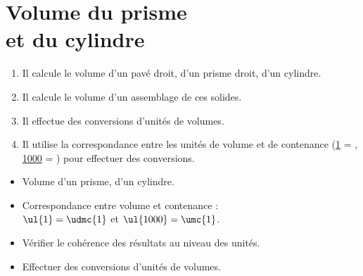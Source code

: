 \themaM
\graphicspath{{../../S19_Volume_du_prisme_et_du_cylindre/Images/}}

\chapter{Volume du prisme\\et du cylindre}
\label{S19}


\begin{autoeval}
   \small
   \begin{enumerate}
      \item Il calcule le volume d'un pavé droit, d'un prisme droit, d'un cylindre.
      \item Il calcule le volume d'un assemblage de ces solides.
      \item Il effectue des conversions d’unités de volumes.
      \item Il utilise la correspondance entre les unités de volume et de contenance (\ul{1} =  , \ul{1000} = ) pour effectuer des conversions.
   \end{enumerate}
\end{autoeval}

\begin{prerequis}
   \begin{itemize}
      \item Volume d'un prisme, d'un cylindre.
      \item Correspondance entre volume et contenance : \\
         $\ul{1} =\udmc{1}$ et $\ul{1000} =\umc{1}$.
      \item[\com] Vérifier le cohérence des résultats au niveau des unités.
      \item[\com] Effectuer des conversions d'unités de volumes.
   \end{itemize}
\end{prerequis}

\vfill

